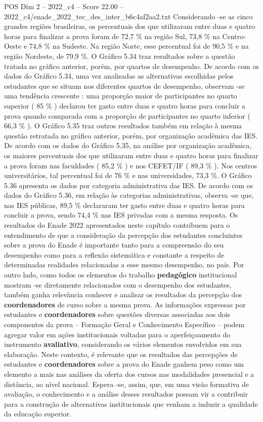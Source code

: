 \begin{textsample}{POS Dim 2 – 2022\_c4 – Score 22.00 – 2022\_c4/enade\_2022\_tec\_des\_inter\_b6c4af2aa2.txt}
Considerando -se as cinco grandes regiões brasileiras, os percentuais dos que utilizaram entre duas e quatro horas para finalizar a prova foram de 72,7 \% na região Sul, 73,8 \% na Centro-Oeste e 74,8 \% na Sudeste.
Na região Norte, esse percentual foi de 90,5 \% e na região Nordeste, de 79,9 \%.
O Gráfico 5.34 traz resultados sobre a questão tratada no gráfico anterior, porém, por quartos de desempenho.
De acordo com os dados do Gráfico 5.34, uma vez analisadas as alternativas escolhidas pelos estudantes que se situam nos diferentes quartos de desempenho, observam -se uma tendência crescente : uma proporção maior de participantes no quarto superior ( 85 \% ) declarou ter gasto entre duas e quatro horas para concluir a prova quando comparada com a proporção de participantes no quarto inferior ( 66,3 \% ).
O Gráfico 5.35 traz outros resultados também em relação à mesma questão retratada no gráfico anterior, porém, por organização acadêmica das IES.
De acordo com os dados do Gráfico 5.35, na análise por organização acadêmica, os maiores percentuais dos que utilizaram entre duas e quatro horas para finalizar a prova foram nas faculdades ( 85,2 \% ) e nos CEFET/IF ( 89,3 \% ).
Nos centros universitários, tal percentual foi de 76 \% e nas universidades, 73,3 \%.
O Gráfico 5.36 apresenta os dados por categoria administrativa das IES.
De acordo com os dados do Gráfico 5.36, em relação às categorias administrativas, observa -se que, nas IES públicas, 89,5 \% declararam ter gasto entre duas e quatro horas para concluir a prova, sendo 74,4 \% nas IES privadas com a mesma resposta.
Os resultados do Enade 2022 apresentados neste capítulo contribuem para o entendimento de que a consideração da percepção dos estudantes concluintes sobre a prova do Enade é importante tanto para a compreensão do seu desempenho como para a reflexão sistemática e constante a respeito de determinadas realidades relacionadas a esse mesmo desempenho, no país.
Por outro lado, como todos os elementos do trabalho \textbf{pedagógico} institucional mostram -se diretamente relacionados com o desempenho dos estudantes, também ganha relevância conhecer e analisar os resultados da percepção dos \textbf{coordenadores} de curso sobre a mesma prova.
As informações expressas por estudantes e \textbf{coordenadores} sobre questões diversas associadas aos dois componentes da prova – Formação Geral e Conhecimento Específico – podem agregar valor em ações institucionais voltadas para o aperfeiçoamento do instrumento \textbf{avaliativo}, considerando os vários elementos envolvidos em sua elaboração.
Neste contexto, é relevante que os resultados das percepções de estudantes e \textbf{coordenadores} sobre a prova do Enade ganhem peso como um elemento a mais nas análises da oferta dos cursos nas modalidades presencial e a distância, ao nível nacional.
Espera -se, assim, que, em uma visão formativa de avaliação, o conhecimento e a análise desses resultados possam vir a contribuir para a construção de alternativas institucionais que venham a induzir a qualidade da educação superior.


\end{textsample}

